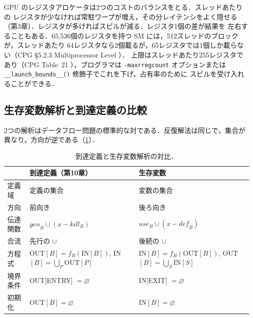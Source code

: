 \documentclass[../main.tex]{subfiles}
\begin{document}
GPU のレジスタアロケータは2つのコストのバランスをとる．スレッドあたりの
レジスタが少なければ常駐ワープが増え，その分レイテンシをよく隠せる
（第3章）．レジスタが多ければスピルが減る．レジスタ1個の差が結果を
左右することもある．65,536個のレジスタを持つ SM には，512スレッドのブロックが，スレッドあたり
64レジスタなら2個載るが，65レジスタでは1個しか載らない（CPG §5.2.3
Multiprocessor Level \cite{nvidia2024cudaguide}）．
上限はスレッドあたり255レジスタであり（CPG Table~21
\cite{nvidia2024cudaguide}），プログラマは
\texttt{-maxrregcount} オプションまたは
\texttt{\_\_launch\_bounds\_\_()} 修飾子でこれを下げ，占有率のために
スピルを受け入れることができる．

\subsection{生存変数解析と到達定義の比較}

2つの解析はデータフロー問題の標準的な対である．反復解法は同じで，集合が
異なり，方向が逆である（\cref{tab:l11-compare}）．

\begin{table}[tb]
  \centering\small
  \begin{tabular}{@{}>{\raggedright\arraybackslash}p{24mm}
                    >{\raggedright\arraybackslash}p{42mm}
                    >{\raggedright\arraybackslash}p{42mm}@{}}
    \toprule
    & 到達定義（第10章） & 生存変数 \\
    \midrule
    定義域 & 定義の集合 & 変数の集合 \\
    方向 & 前向き & 後ろ向き \\
    伝達関数 & $\mathit{gen}_B \cup (x - \mathit{kill}_B)$ &
      $\mathit{use}_B \cup (x - \mathit{def}_B)$ \\
    合流 & 先行の $\cup$ & 後続の $\cup$ \\
    方程式 & OUT$[B] = f_B(\mathrm{IN}[B])$, IN$[B] = \bigcup_{P}
      \mathrm{OUT}[P]$ & IN$[B] = f_B(\mathrm{OUT}[B])$, OUT$[B] =
      \bigcup_{S} \mathrm{IN}[S]$ \\
    境界条件 & OUT[ENTRY] $= \varnothing$ & IN[EXIT] $= \varnothing$ \\
    初期化 & OUT$[B] = \varnothing$ & IN$[B] = \varnothing$ \\
    \bottomrule
  \end{tabular}
  \caption{到達定義と生存変数解析の対比．}
  \label{tab:l11-compare}
\end{table}
\end{document}
